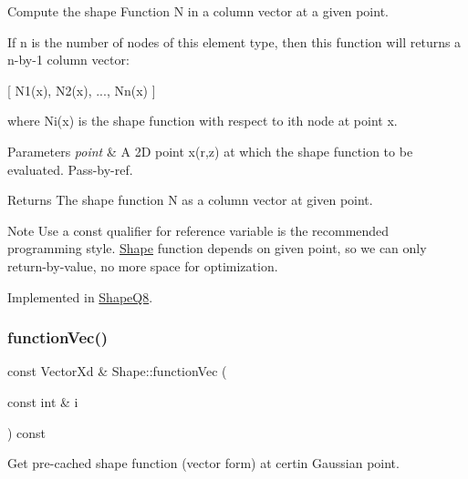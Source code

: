 Compute the shape Function N in a column vector at a given point. 

If n is the number of nodes of this element type, then this function will returns a n-\/by-\/1 column vector\+:

\mbox{[} N1(x), N2(x), ..., Nn(x) \mbox{]}

where Ni(x) is the shape function with respect to ith node at point x.


\begin{DoxyParams}{Parameters}
{\em point} & A 2D point x(r,z) at which the shape function to be evaluated. Pass-\/by-\/ref. \\
\hline
\end{DoxyParams}
\begin{DoxyReturn}{Returns}
The shape function N as a column vector at given point.
\end{DoxyReturn}
\begin{DoxyNote}{Note}
Use a const qualifier for reference variable is the recommended programming style. \mbox{\hyperlink{class_shape}{Shape}} function depends on given point, so we can only return-\/by-\/value, no more space for optimization. 
\end{DoxyNote}


Implemented in \mbox{\hyperlink{class_shape_q8_a7e2de42658deff3c6912cc102b12cc96}{Shape\+Q8}}.

\mbox{\label{class_shape_a69936bb268e5a1547f5e5838dde5bcdf}} 
\subsubsection{\texorpdfstring{function\+Vec()}{functionVec()}\hspace{0.1cm}{\footnotesize\ttfamily [2/2]}}
{\footnotesize\ttfamily const Vector\+Xd \& Shape\+::function\+Vec (\begin{DoxyParamCaption}\item[{const int \&}]{i }\end{DoxyParamCaption}) const}



Get pre-\/cached shape function (vector form) at certin Gaussian point. 


